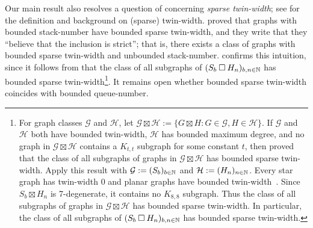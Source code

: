 \documentclass[kpfonts]{patmorin}
\newcommand{\CartProd}{\mathbin{\square}}
\begin{document}



Our main result also resolves a question of \citet{BGKTWb} concerning \emph{sparse twin-width}; see \citep{BKTW,BGKTWa,BGKTWb} for the definition and background on (sparse) twin-width. \citet{BGKTWb} proved that graphs with bounded stack-number have bounded sparse twin-width, and they write that they ``believe that the inclusion is strict''; that is, there exists a class of graphs with bounded sparse twin-width and unbounded stack-number.  confirms this intuition, since it follows from \citep[Theorem~10]{BGKTWb} that the class of all subgraphs of $(S_b \CartProd H_n)_{b,n\in\N}$ has bounded sparse twin-width\footnote{For graph classes $\mathcal{G}$ and $\mathcal{H}$, let $\mathcal{G}\boxtimes \mathcal{H} := \{ G\boxtimes H: G \in \mathcal{G}, H\in \mathcal{H}\}$. If $\mathcal{G}$ and $\mathcal{H}$ both have bounded twin-width, $\mathcal{H}$ has bounded maximum degree, and no graph in $\mathcal{G}\boxtimes \mathcal{H}$ contains a $K_{t,t}$ subgraph for some constant $t$, then \citet[Theorem~10]{BGKTWb} proved that the class of all subgraphs of graphs in $\mathcal{G}\boxtimes \mathcal{H}$ has bounded sparse twin-width. Apply this result with $\mathcal{G}:= (S_b)_{b\in \mathbb{N}}$ and $\mathcal{H}:= (H_n)_{n\in\mathbb{N}}$. Every star graph has twin-width $0$ and planar graphs have bounded twin-width~\citep{BKTW}. Since $S_b \boxtimes H_n$ is 7-degenerate, it contains no $K_{8,8}$ subgraph. Thus the class of all subgraphs of graphs in $\mathcal{G} \boxtimes \mathcal{H}$ has bounded sparse twin-width. In particular, the class of all subgraphs of $(S_b \CartProd H_n)_{b,n\in\N}$ has bounded sparse twin-width.}. It remains open whether bounded sparse twin-width coincides with bounded queue-number.
\end{document}
